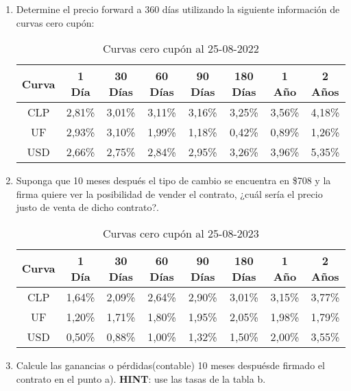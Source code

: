 \documentclass[12pt]{article}
\begin{document}
\begin{enumerate}[label=\textbf{\alph*)}]
\item Determine el precio forward a 360 días utilizando la siguiente información de curvas cero cupón:
\begin{table}[h!]
    \centering
    \caption{Curvas cero cupón al 25-08-2022}
    \begin{tabular}{|c|c|c|c|c|c|c|c|}
    \hline
    \textbf{Curva} & \textbf{1 Día} & \textbf{30 Días} & \textbf{60 Días} & \textbf{90 Días} & \textbf{180 Días} & \textbf{1 Año} & \textbf{2 Años} \\
    \hline
    CLP & 2{,}81\% & 3{,}01\% & 3{,}11\% & 3{,}16\% & 3{,}25\% & 3{,}56\% & 4{,}18\% \\
    UF  & 2{,}93\% & 3{,}10\% & 1{,}99\% & 1{,}18\% & 0{,}42\% & 0{,}89\% & 1{,}26\% \\
    USD & 2{,}66\% & 2{,}75\% & 2{,}84\% & 2{,}95\% & 3{,}26\% & 3{,}96\% & 5{,}35\% \\
    \hline
    \end{tabular}
\end{table}
\item	Suponga que 10 meses después el tipo de cambio se encuentra en \$708 y la firma quiere ver
la posibilidad de vender el contrato, ¿cuál sería el precio justo de venta de dicho contrato?.
\begin{table}[h!]
    \centering
    \caption{Curvas cero cupón al 25-08-2023}
    \begin{tabular}{|c|c|c|c|c|c|c|c|}
    \hline
    \textbf{Curva} & \textbf{1 Día} & \textbf{30 Días} & \textbf{60 Días} & \textbf{90 Días} & \textbf{180 Días} & \textbf{1 Año} & \textbf{2 Años} \\
    \hline
    CLP & 1{,}64\% & 2{,}09\% & 2{,}64\% & 2{,}90\% & 3{,}01\% & 3{,}15\% & 3{,}77\% \\
    UF  & 1{,}20\% & 1{,}71\% & 1{,}80\% & 1{,}95\% & 2{,}05\% & 1{,}98\% & 1{,}79\% \\
    USD & 0{,}50\% & 0{,}88\% & 1{,}00\% & 1{,}32\% & 1{,}50\% & 2{,}00\% & 3{,}55\% \\
    \hline
    \end{tabular}
\end{table}
\item Calcule las ganancias o pérdidas(contable) 10 meses despuésde firmado el contrato en el 
    punto a). \textbf{HINT}: use las tasas de la tabla b.
\end{enumerate}
\end{document}

